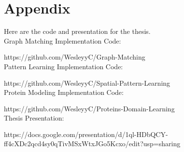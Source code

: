 \chapter*{Appendix}

Here are the code and presentation for the thesis.\\

Graph Matching Implementation Code:

https://github.com/WesleyyC/Graph-Matching\\

Pattern Learning Implementation Code:

https://github.com/WesleyyC/Spatial-Pattern-Learning\\

Protein Modeling Implementation Code:

https://github.com/WesleyyC/Proteins-Domain-Learning\\

Thesis Presentation:

https://docs.google.com/presentation/d/1ql-HDbQCY-ff4cXDc2qcd4sy0qTivMSxWtxJGo5Kcxo/edit?usp=sharing